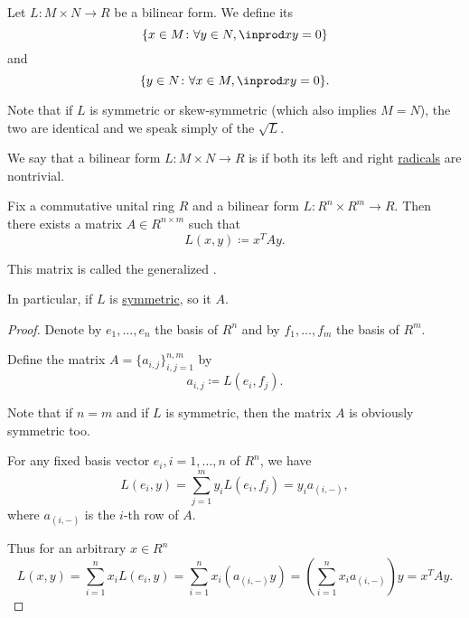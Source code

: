 \begin{definition}\label{def:bilinear_form_radicals}
  Let \( L: M \times N \to R \) be a bilinear form. We define its 
  \begin{equation*}
    \{ x \in M \colon \forall y \in N, \inprod x y = 0 \}
  \end{equation*}
  and 
  \begin{equation*}
    \{ y \in N \colon \forall x \in M, \inprod x y = 0 \}.
  \end{equation*}

  Note that if \( L \) is symmetric or skew-symmetric (which also implies \( M = N \)), the two are identical and we speak simply of the  \( \sqrt L \).
\end{definition}

\begin{definition}\label{def:nondegenerate_bilinear_form}
  We say that a bilinear form \( L: M \times N \to R \) is  if both its left and right \hyperref[def:bilinear_form_radicals]{radicals} are nontrivial.
\end{definition}

\begin{theorem}\label{thm:bilinear_form_matrix_presentation}
  Fix a commutative unital ring \( R \) and a bilinear form \( L: R^n \times R^m \to R \). Then there exists a matrix \( A \in R^{n \times m} \) such that
  \begin{equation*}
    L(x, y) \coloneqq x^T A y.
  \end{equation*}

  This matrix is called the generalized .

  In particular, if \( L \) is \hyperref[def:symmetric_function]{symmetric}, so it \( A \).
\end{theorem}
\begin{proof}
  Denote by \( e_1, \ldots, e_n \) the basis of \( R^n \) and by \( f_1, \ldots, f_m \) the basis of \( R^m \).

  Define the matrix \( A = \{ a_{i,j} \}_{i,j=1}^{n,m} \) by
  \begin{equation*}
    a_{i,j} \coloneqq L(e_i, f_j).
  \end{equation*}

  Note that if \( n = m \) and if \( L \) is symmetric, then the matrix \( A \) is obviously symmetric too.

  For any fixed basis vector \( e_i, i = 1, \ldots, n \) of \( R^n \), we have
  \begin{equation*}
    L(e_i, y)
    =
    \sum_{j=1}^m y_i L(e_i, f_j)
    =
    y_i a_{(i,-)},
  \end{equation*}
  where \( a_{(i,-)} \) is the \( i \)-th row of \( A \).

  Thus for an arbitrary \( x \in R^n \)
  \begin{equation*}
    L(x, y)
    =
    \sum_{i=1}^n x_i L(e_i, y)
    =
    \sum_{i=1}^n x_i (a_{(i,-)} y)
    =
    \left( \sum_{i=1}^n x_i a_{(i,-)} \right) y
    =
    x^T A y.
  \end{equation*}
\end{proof}


